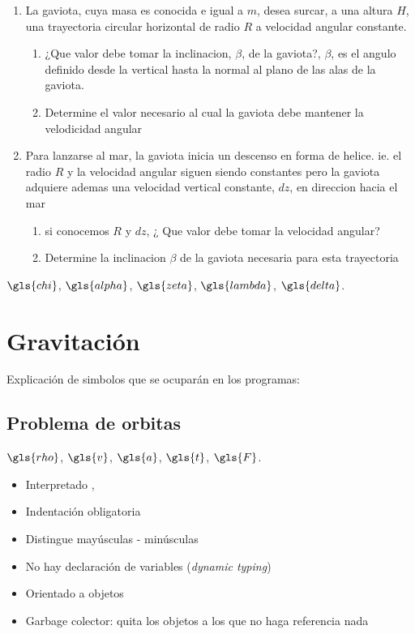 \documentclass[letterpaper,12pt]{article}
\begin{document}
\begin{enumerate}
\item La gaviota, cuya masa es conocida e igual a $m$, desea surcar, a una altura $H$, 
una trayectoria circular horizontal de radio $R$ a velocidad angular constante.
	\begin{enumerate}
	\item ¿Que valor debe tomar la inclinacion, $\beta$, de la gaviota?, $\beta$, 
	es el angulo definido desde la vertical hasta la normal al plano de las alas de la gaviota.
	\item Determine el valor necesario al cual la gaviota debe mantener la velodicidad angular
	\end{enumerate}
\item Para lanzarse al mar, la gaviota inicia un descenso en forma de helice. 
ie. el radio $R$ y la velocidad angular siguen siendo constantes pero la gaviota 
adquiere ademas una velocidad vertical constante, $dz$, en direccion hacia el mar
	\begin{enumerate}
	\item si conocemos $R$ y $dz$, ¿ Que valor debe tomar la velocidad angular?
	\item Determine la inclinacion $\beta$ de la gaviota necesaria para esta trayectoria
	\end{enumerate}
\end{enumerate}
$\gls{chi}$, $\gls{alpha}$, $\gls{zeta}$, $\gls{lambda}$, $\gls{delta}$.




\section{Gravitación}
Explicación de simbolos que se ocuparán en los programas:
\subsection*{Problema de orbitas}
$\gls{rho}$, $\gls{v}$, $\gls{a}$, $\gls{t}$,
$\gls{F}$. 
\begin{itemize}
    \item Interpretado ,
    \item Indentación obligatoria
    \item Distingue mayúsculas - minúsculas
    \item No hay declaración de variables (\textit{dynamic typing})
    \item Orientado a objetos  
    \item Garbage colector: quita los objetos a los que no haga referencia nada
\end{itemize}
\end{document}
